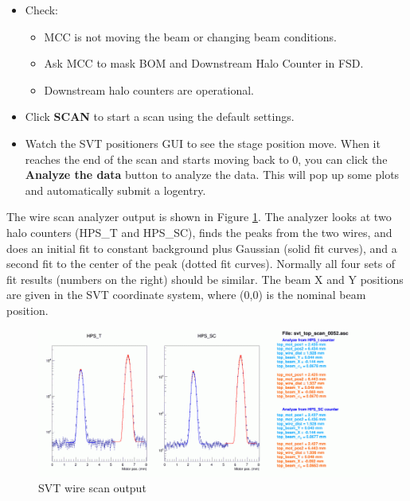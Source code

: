 \documentclass[12pt]{report}
\begin{document}
\begin{itemize}
\item Check:
\begin{itemize}
\item
MCC is not moving the beam or changing beam conditions.
\item
Ask MCC to mask BOM and Downstream Halo Counter in FSD.
\item
Downstream halo counters are operational.
\end{itemize}
\item
Click \textbf{SCAN} to start a scan using the default settings.
\item
Watch the SVT positioners GUI to see the stage position move. When it reaches the end of the scan and starts moving back to 0, you can click the \textbf{Analyze the data} button to analyze the data. This will pop up some plots and automatically submit a logentry.
\end{itemize}

The wire scan analyzer output is shown in Figure \ref{scanneroutput}. The analyzer looks at two halo counters (HPS\_T and HPS\_SC), finds the peaks from the two wires, and does an initial fit to constant background plus Gaussian (solid fit curves), and a second fit to the center of the peak (dotted fit curves). Normally all four sets of fit results (numbers on the right) should be similar. The beam X and Y positions are given in the SVT coordinate system, where (0,0) is the nominal beam position.

\begin{figure}[ht!]
\centering
\includegraphics[width=\textwidth]{svt_wirescan_output}
\caption{SVT wire scan output}
\label{scanneroutput}
\end{figure}
\end{document}
